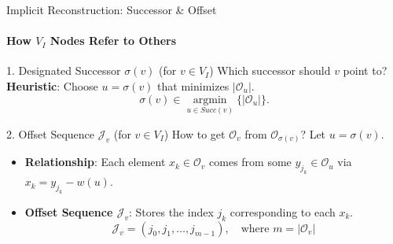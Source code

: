 \begin{frame}{Implicit Reconstruction: Successor \& Offset}
    \framesubtitle{How $V_I$ Nodes Refer to Others}

    \begin{block}{1. Designated Successor $\sigma(v)$ (for $v \in V_I$)}
        Which successor should $v$ point to?
        \textbf{Heuristic}: Choose $u = \sigma(v)$ that minimizes $|\mathcal{O}_u|$.
        \[ \sigma(v) \in \underset{u \in Succ(v)}{\operatorname{argmin}} \{ |\mathcal{O}_u| \}. \]
    \end{block}
    \begin{block}{2. Offset Sequence $\mathcal{J}_v$ (for $v \in V_I$)}
        How to get $\mathcal{O}_v$ from $\mathcal{O}_{\sigma(v)}$? Let $u=\sigma(v)$.
        \begin{itemize}
            \item \textbf{Relationship}: Each element $x_k \in \mathcal{O}_v$ comes from some $y_{j_k} \in \mathcal{O}_u$ via $x_k = y_{j_k} - w(u)$.
            \item \textbf{Offset Sequence $\mathcal{J}_v$}: Stores the index $j_k$ corresponding to each $x_k$.
                  \[ \mathcal{J}_v = (j_0, j_1, \dots, j_{m-1}), \quad \text{where } m = |\mathcal{O}_v| \]
        \end{itemize}
    \end{block}

\end{frame}

